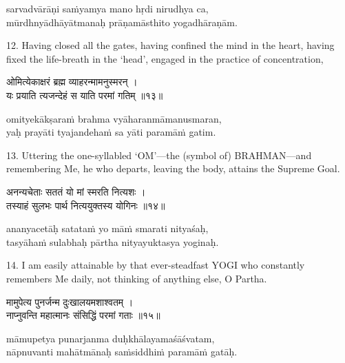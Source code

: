 \begin{transliteration}
sarvadvārāṇi saṁyamya mano hṛdi nirudhya ca, \\
mūrdhnyādhāyātmanaḥ prāṇamāsthito yogadhāraṇām.
\end{transliteration}

12. Having closed all the gates, having confined the mind in the heart, having
fixed the life-breath in the `head', engaged in the practice of concentration,

\begin{gitaverse}
ओमित्येकाक्षरं ब्रह्म व्याहरन्मामनुस्मरन् । \\
यः प्रयाति त्यजन्देहं स याति परमां गतिम् ॥१३॥
\end{gitaverse}

\begin{transliteration}
omityekākṣaraṁ brahma vyāharanmāmanusmaran, \\
yaḥ prayāti tyajandehaṁ sa yāti paramāṁ gatim.
\end{transliteration}

13. Uttering the one-syllabled `OM'---the (symbol of) BRAHMAN---and remembering
Me, he who departs, leaving the body, attains the Supreme Goal.

\begin{gitaverse}
अनन्यचेताः सततं यो मां स्मरति नित्यशः । \\
तस्याहं सुलभः पार्थ नित्ययुक्तस्य योगिनः ॥१४॥
\end{gitaverse}

\begin{transliteration}
ananyacetāḥ satataṁ yo māṁ smarati nityaśaḥ, \\
tasyāhaṁ sulabhaḥ pārtha nityayuktasya yoginaḥ.
\end{transliteration}

14. I am easily attainable by that ever-steadfast YOGI who constantly remembers
Me daily, not thinking of anything else, O Partha.

\begin{gitaverse}
मामुपेत्य पुनर्जन्म दुःखालयमशाश्वतम् । \\
नाप्नुवन्ति महात्मानः संसिद्धिं परमां गताः ॥१५॥
\end{gitaverse}

\begin{transliteration}
māmupetya punarjanma duḥkhālayamaśāśvatam, \\
nāpnuvanti mahātmānaḥ saṁsiddhiṁ paramāṁ gatāḥ.
\end{transliteration}

